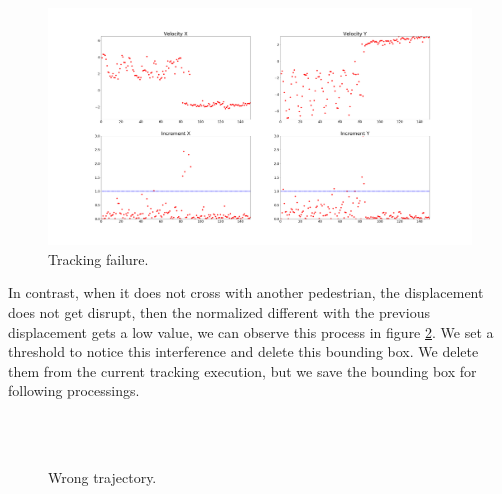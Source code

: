 \begin{figure}[H]
\centering         
\includegraphics[width=0.9\linewidth]{velocidadas/bad_threshold.png}
\caption{Tracking failure.} \label{traccs23}
\end{figure}


In contrast, when it does not cross with another pedestrian, the displacement does not get disrupt, then the normalized different with the previous displacement gets a low value, we can observe this process in figure \ref{motion2nocoorrect}. We set a threshold to notice this interference and delete this bounding box. We delete them from the current tracking execution, but we save the bounding box for following processings.

\begin{figure}[H]
		
\centering

\\
\\
\caption{Wrong trajectory.}
\label{motion2nocoorrect}
\end{figure}













